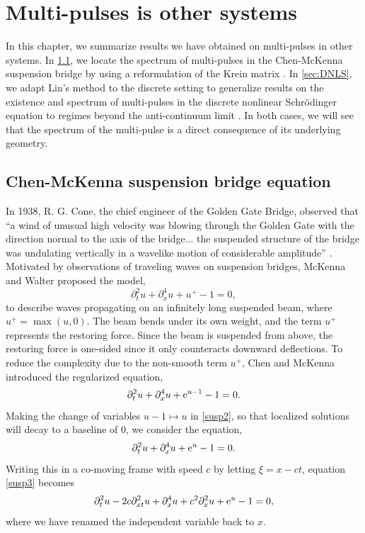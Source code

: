 \documentclass[thesis.tex]{subfiles}
\begin{document}
\iffulldocument\else
	\chapter{Multi-pulses is other systems}
\fi

In this chapter, we summarize results we have obtained on multi-pulses in other systems. In \cref{sec:chen}, we locate the spectrum of multi-pulses in the Chen-McKenna suspension bridge by using a reformulation of the Krein matrix \cite{kapitula2019}. In \cref{sec:DNLS}, we adapt Lin's method to the discrete setting to generalize results on the existence and spectrum of multi-pulses in the discrete nonlinear Schr{\"o}dinger equation to regimes beyond the anti-continuum limit \cite{parker2019}. In both cases, we will see that the spectrum of the multi-pulse is a direct consequence of its underlying geometry. 

\section{Chen-McKenna suspension bridge equation}\label{sec:chen}

In 1938, R. G. Cone, the chief engineer of the Golden Gate Bridge, observed that ``a wind of unusual high velocity was blowing through the Golden Gate with the direction normal to the axis of the bridge... the suspended structure of the bridge was undulating vertically in a wavelike motion of considerable amplitude'' \cite{McKenna1990}. Motivated by observations of traveling waves on suspension bridges, McKenna and Walter \cite{McKenna1990} proposed the model,
\begin{equation}\label{susp}
\partial_t^2u + \partial_x^4u + u^+ - 1 = 0,
\end{equation}
to describe waves propagating on an infinitely long suspended beam, where $u^+ = \max(u, 0)$. The beam bends under its own weight, and the term $u^+$ represents the restoring force. Since the beam is suspended from above, the restoring force is one-sided since it only counteracts downward deflections. To reduce the complexity due to the non-smooth term $u^+$, Chen and McKenna \cite{Chen1997} introduced the regularized equation,
\begin{equation}\label{susp2}
\partial_t^2u + \partial_x^4u + \mathrm{e}^{u-1} - 1 = 0.
\end{equation}
Making the change of variables $u - 1 \mapsto u$ in \cref{susp2}, so that localized solutions will decay to a baseline of 0, we consider the equation,
\begin{equation}\label{susp3}
\partial_t^2u + \partial_x^4u +  \mathrm{e}^{u} - 1 = 0.
\end{equation}
Writing this in a co-moving frame with speed $c$ by letting $\xi = x - ct$, equation \cref{susp3} becomes
\begin{equation}\label{suspc}
\partial_t^2u - 2 c\partial_{xt}^2u +\partial_x^4u +  c^2\partial_x^2u + \mathrm{e}^{u} - 1 = 0,
\end{equation}
where we have renamed the independent variable back to $x$.
\end{document}
